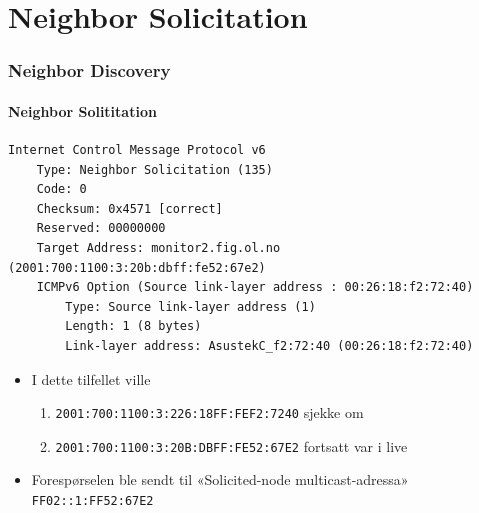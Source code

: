 \section{Neighbor Solicitation}
\begin{frame}[fragile]%
  \frametitle{Neighbor Discovery}
  \framesubtitle{Neighbor Solititation}
  \pause
\begin{Verbatim}[fontsize=\tiny]
Internet Control Message Protocol v6
    Type: Neighbor Solicitation (135)
    Code: 0
    Checksum: 0x4571 [correct]
    Reserved: 00000000
    Target Address: monitor2.fig.ol.no (2001:700:1100:3:20b:dbff:fe52:67e2)
    ICMPv6 Option (Source link-layer address : 00:26:18:f2:72:40)
        Type: Source link-layer address (1)
        Length: 1 (8 bytes)
        Link-layer address: AsustekC_f2:72:40 (00:26:18:f2:72:40)
\end{Verbatim}
  \pause
  \begin{itemize}[<+->]
  \item I dette tilfellet ville
    \begin{enumerate}[<+->]
    \item \texttt{2001:700:1100:3:226:18FF:FEF2:7240} sjekke om
    \item \texttt{2001:700:1100:3:20B:DBFF:FE\alert<7>{52}:\alert<7>{67E2}}
      fortsatt var i live
    \end{enumerate}
  \item Forespørselen ble sendt til «Solicited-node multicast-adressa»
    \texttt{FF02::1:FF\alert<7>{52}:\alert<7>{67E2}}
  \end{itemize}
\end{frame}

